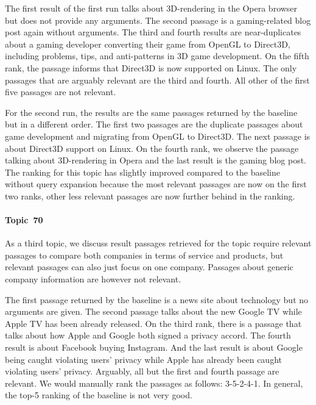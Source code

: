 The first result of the first run talks about 3D-rendering in the Opera browser but does not provide any arguments.
The second passage is a gaming-related blog post again without arguments.
The third and fourth results are near-duplicates about a gaming developer converting their game from OpenGL to Direct3D, including problems, tips, and anti-patterns in 3D game development.
On the fifth rank, the passage informs that Direct3D is now supported on Linux.
The only passages that are arguably relevant are the third and fourth.
All other of the first five passages are not relevant.

For the second run, the results are the same passages returned by the baseline but in a different order.
The first two passages are the duplicate passages about game development and migrating from OpenGL to Direct3D.
The next passage is about Direct3D support on Linux.
On the fourth rank, we observe the passage talking about 3D-rendering in Opera and the last result is the gaming blog post.
The ranking for this topic has slightly improved compared to the baseline without query expansion because the most relevant passages are now on the first two ranks, other less relevant passages are now further behind in the ranking.

\paragraph{Topic~70}

As a third topic, we discuss result passages retrieved for the topic
\citet{BondarenkoFKSGBPBSWPH2022} require relevant passages to compare both companies in terms of service and products, but relevant passages can also just focus on one company.
Passages about generic company information are however not relevant.

The first passage returned by the baseline is a news site about technology but no arguments are given.
The second passage talks about the new Google TV while Apple TV has been already released.
On the third rank, there is a passage that talks about how Apple and Google both signed a privacy accord.
The fourth result is about Facebook buying Instagram.
And the last result is about Google being caught violating users' privacy while Apple has already been caught violating users' privacy.
Arguably, all but the first and fourth passage are relevant.
We would manually rank the passages as follows: 3-5-2-4-1.
In general, the top-5 ranking of the baseline is not very good.

